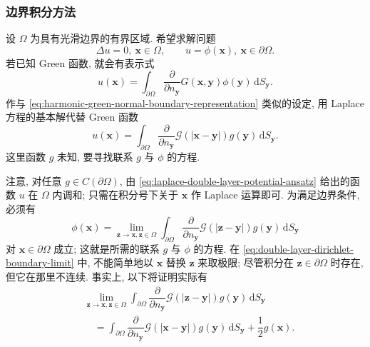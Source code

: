 \subsubsection{边界积分方法}\label{subsec:boundary-integral-methods}

设 $\Omega$ 为具有光滑边界的有界区域. 希望求解问题
\begin{equation}\label{eq:harmonic-dirichlet-boundary-integral-problem}
\Delta u=0,\ \bm{x}\in\Omega,\qquad u=\phi(\bm{x}),\ \bm{x}\in\partial\Omega.
\end{equation}
若已知 Green 函数, 就会有表示式
\begin{equation}\label{eq:harmonic-green-normal-boundary-representation}
u(\bm{x})=\int_{\partial\Omega}\dfrac{\partial}{\partial n_{\bm{y}}}G(\bm{x},\bm{y})\phi(\bm{y})\,\mathrm{d}S_{\bm{y}}.
\end{equation}
作与 \eqref{eq:harmonic-green-normal-boundary-representation} 类似的设定, 用 Laplace 方程的基本解代替 Green 函数
\begin{equation}\label{eq:laplace-double-layer-potential-ansatz}
u(\bm{x})=\int_{\partial\Omega}\dfrac{\partial}{\partial n_{\bm{y}}}\mathcal{G}(|\bm{x}-\bm{y}|)g(\bm{y})\,\mathrm{d}S_{\bm{y}}.
\end{equation}
这里函数 $g$ 未知, 要寻找联系 $g$ 与 $\phi$ 的方程.

注意, 对任意 $g\in C(\partial\Omega)$, 由 \eqref{eq:laplace-double-layer-potential-ansatz} 给出的函数 $u$ 在 $\Omega$ 内调和; 只需在积分号下关于 $\bm{x}$ 作 Laplace 运算即可. 为满足边界条件, 必须有
\begin{equation}\label{eq:double-layer-dirichlet-boundary-limit}
\phi(\bm{x})=\lim_{\bm{z}\to\bm{x},\bm{z}\in\Omega}\int_{\partial\Omega}\dfrac{\partial}{\partial n_{\bm{y}}}\mathcal{G}(|\bm{z}-\bm{y}|)g(\bm{y})\,\mathrm{d}S_{\bm{y}}
\end{equation}
对 $\bm{x}\in\partial\Omega$ 成立; 这就是所需的联系 $g$ 与 $\phi$ 的方程. 在 \eqref{eq:double-layer-dirichlet-boundary-limit} 中, 不能简单地以 $\bm{x}$ 替换 $\bm{z}$ 来取极限; 尽管积分在 $\bm{z}\in\partial\Omega$ 时存在, 但它在那里不连续. 事实上, 以下将证明实际有
\begin{equation}\label{eq:double-layer-interior-jump-relation}
\begin{aligned}
&\lim_{\bm{z}\to\bm{x},\bm{z}\in\Omega}\int_{\partial\Omega}\dfrac{\partial}{\partial n_{\bm{y}}}\mathcal{G}(|\bm{z}-\bm{y}|)g(\bm{y})\,\mathrm{d}S_{\bm{y}}\\
&\quad=\int_{\partial\Omega}\dfrac{\partial}{\partial n_{\bm{y}}}\mathcal{G}(|\bm{x}-\bm{y}|)g(\bm{y})\,\mathrm{d}S_{\bm{y}}+\dfrac12g(\bm{x}).
\end{aligned}
\end{equation}



